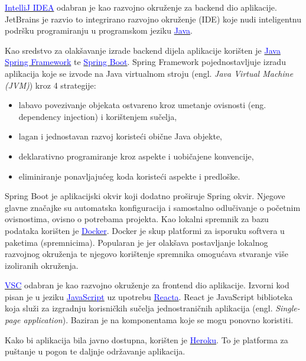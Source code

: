         \par{
             \href{https://www.jetbrains.com/idea/}{\textcolor{blue}{IntelliJ IDEA}} odabran je kao razvojno okruženje za backend dio aplikacije. JetBrains je razvio to integrirano razvojno okruženje (IDE) koje nudi inteligentnu podršku programiranju u programskom jeziku \href{https://www.java.com/}{\textcolor{blue}{Java}}. 
            
            Kao sredstvo za olakšavanje izrade backend dijela aplikacije korišten je \href{https://spring.io/projects/spring-framework}{\textcolor{blue}{Java Spring Framework}} te
            \href{https://spring.io/projects/spring-boot}{\textcolor{blue}{Spring Boot}}. Spring Framework pojednostavljuje izradu aplikacija koje se izvode na Java virtualnom stroju (engl. \textit{Java Virtual Machine (JVM)}) kroz 4 strategije: 
            \begin{itemize}
                \item  labavo povezivanje objekata ostvareno kroz umetanje ovisnosti (eng. dependency injection) i korištenjem sučelja,
                \item lagan i jednostavan razvoj koristeći obične Java objekte,
                \item deklarativno programiranje kroz aspekte i uobičajene konvencije,
                \item eliminiranje ponavljajućeg koda koristeći aspekte i predloške.
            \end{itemize}
              Spring Boot je aplikacijski okvir koji dodatno proširuje Spring okvir. Njegove glavne značajke su automatska konfiguracija i samostalno odlučivanje o početnim ovisnostima, ovisno o potrebama projekta.
            Kao lokalni spremnik za bazu podataka korišten je            \href{https://www.docker.com/}{\textcolor{blue}{Docker}}. Docker je skup platformi za isporuku softvera u paketima (spremnicima). Popularan je jer olakšava postavljanje lokalnog razvojnog okruženja te njegovo korištenje spremnika omogućava stvaranje više izoliranih okruženja.
            
            \href{https://code.visualstudio.com/}{\textcolor{blue}{VSC}} odabran je kao razvojno okruženje za frontend dio aplikacije. Izvorni kod pisan je u jeziku \href{https://www.javascript.com/}{\textcolor{blue}{JavaScript}} uz upotrebu \href{https://reactjs.org/}{\textcolor{blue}{Reacta}}. React je JavaScript biblioteka koja služi za izgradnju korisničkih sučelja jednostraničnih aplikacija (engl. \textit{Single-page application}). Baziran je na komponentama koje se mogu ponovno koristiti.
            
            Kako bi aplikacija bila javno dostupna, korišten je \href{https://www.heroku.com/}{\textcolor{blue}{Heroku}}. To je platforma za puštanje u pogon te daljnje održavanje aplikacija.
        }

